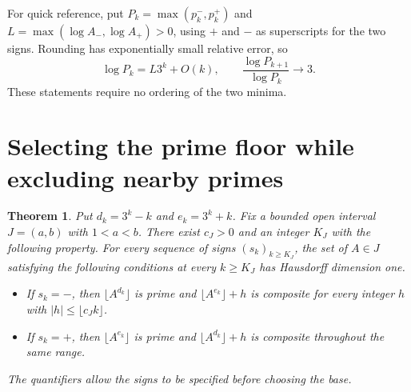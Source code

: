 \documentclass[11pt]{article}
\newtheorem{theorem}{Theorem}
\theoremstyle{remark}\newtheorem*{remark}{Remark}
\begin{document}
For quick reference, put $P_k=\max(p_k^-,p_k^+)$ and
$L=\max(\log A_-,\log A_+)>0$, using $+$ and $-$ as superscripts for the
two signs. Rounding has exponentially small relative error, so
\begin{equation}\label{eq:growth}
 \log P_k=L3^k+O(k),\qquad
 \frac{\log P_{k+1}}{\log P_k}\longrightarrow3 .
\end{equation}
These statements require no ordering of the two minima.

\section{Selecting the prime floor while excluding nearby primes}
\label{sec:switch}

\begin{theorem}\label{th:switch}Put $d_k=3^k-k$ and $e_k=3^k+k$. Fix a bounded open interval
$J=(a,b)$ with $1<a<b$. There exist $c_J>0$ and an integer $K_J$
with the following property. For every sequence of signs
$(s_k)_{k\ge K_J}$, the set of $A\in J$ satisfying the following
conditions at every $k\ge K_J$ has Hausdorff dimension one.
\begin{itemize}
\item If $s_k=-$, then $\lfloor A^{d_k}\rfloor$ is prime and
      $\lfloor A^{e_k}\rfloor+h$ is composite for every integer
      $h$ with $|h|\le\lfloor c_J k\rfloor$.
\item If $s_k=+$, then $\lfloor A^{e_k}\rfloor$ is prime and
      $\lfloor A^{d_k}\rfloor+h$ is composite throughout the same range.
\end{itemize}
The quantifiers allow the signs to be specified before choosing the
base.
\end{theorem}
\end{document}
